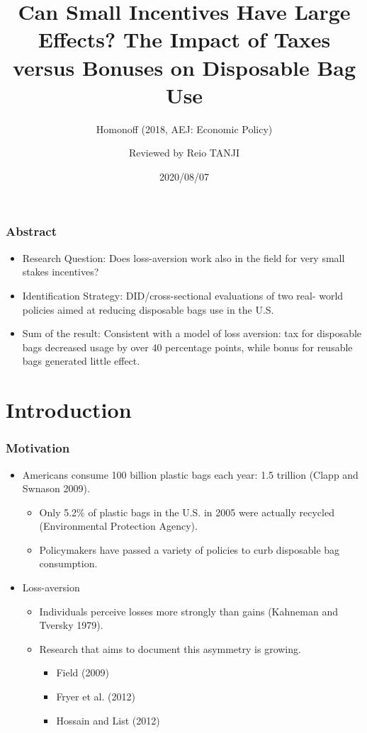 \documentclass[dvipdfmx,11pt]{beamer}
\title{Can Small Incentives Have Large Effects? The Impact of Taxes versus Bonuses on Disposable Bag Use}
\subtitle{Homonoff (2018, AEJ: Economic Policy)}
\author{Reviewed by Reio TANJI}
\date{2020/08/07}
\institute{}
\begin{document}
\begin{frame}\frametitle{}
\titlepage
\end{frame}

\begin{frame}\frametitle{Abstract}
  \begin{itemize}
    \item Research Question: Does loss-aversion work also in the field for very small stakes incentives?
    \item Identification Strategy: DID/cross-sectional evaluations of two real- world policies aimed at reducing disposable bags use in the U.S.
    \item Sum of the result: Consistent with a model of loss aversion: tax for disposable bags decreased usage by over 40 percentage points, while bonus for reusable bags generated little effect.
  \end{itemize}
\end{frame}

\section{Introduction}

\frame{\sectionpage}

\begin{frame}\frametitle{Motivation}
  \begin{itemize}
    \item Americans consume 100 billion plastic bags each year: 1.5 trillion (Clapp and Swnason 2009).
    \begin{itemize}
      \item Only 5.2\% of plastic bags in the U.S. in 2005 were actually recycled (Environmental Protection Agency).
      \item Policymakers have passed a variety of policies to curb disposable bag consumption.
    \end{itemize}
    \item Loss-aversion
    \begin{itemize}
      \item Individuals perceive losses more strongly than gains (Kahneman and Tversky 1979).
      \item Research that aims to document this asymmetry is growing.
      \begin{itemize}
        \item Field (2009)
        \item Fryer et al. (2012)
        \item Hossain and List (2012)
      \end{itemize}
    \end{itemize}
  \end{itemize}
\end{frame}
\end{document}
